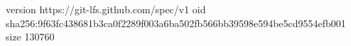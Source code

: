 version https://git-lfs.github.com/spec/v1
oid sha256:9f63fc438681b3ca0f2289f003a6ba502fb566bb39598e594be5cd9554efb001
size 130760
